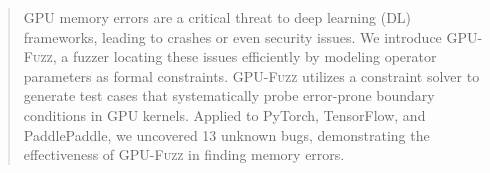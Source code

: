 \documentclass[sigconf]{acmart}
\begin{document}
\makeatletter
\def\@mkauthors@iii{%
  \gdef\@currentauthors{}%
  \gdef\@currentaffiliation{}%
  \global\setbox\mktitle@bx=\vbox{%
    \noindent\unvbox\mktitle@bx\par\medskip
    \centering
    {\Large
      Zihao Li\textsuperscript{1,2,*},
      Hongyi Lu\textsuperscript{1,2,3,*},
      Yanan Guo\textsuperscript{4},
      Zhenkai Zhang\textsuperscript{5},
      Shuai Wang\textsuperscript{3},
      Fengwei Zhang\textsuperscript{2,1,\textdagger}\par}%
    \vspace{0.3em}%
    {\normalsize
      \nolinkurl{lizh2025@mail.sustech.edu.cn},
      \nolinkurl{luhy2017@mail.sustech.edu.cn},
      \nolinkurl{yanan.guo@rochester.edu}\par
      \nolinkurl{zhenkai@clemson.edu},
      \nolinkurl{shuaiw@cse.ust.hk},
      \nolinkurl{zhangfw@sustech.edu.cn}\par}%
    \vspace{0.2em}%
    {{\small\rmfamily\itshape
      \textsuperscript{1}Research Institute of Trustworthy Autonomous Systems, Southern University of Science and Technology\par
      \textsuperscript{2}Department of Computer Science and Engineering, Southern University of Science and Technology\par
      \textsuperscript{3}Department of Computer Science and Engineering, Hong Kong University of Science and Technology\par
      \textsuperscript{4}University of Rochester\par
      \textsuperscript{5}Clemson University\par}}%
    \vspace{0.4em}%
  }%
}
\makeatother

\begin{abstract}
  GPU memory errors are a critical threat to deep learning (DL) frameworks, leading to crashes or even security issues. We introduce \textsc{GPU-Fuzz}, a fuzzer locating these issues efficiently by modeling operator parameters as formal constraints. \textsc{GPU-Fuzz} utilizes a constraint solver to generate test cases that systematically probe error-prone boundary conditions in GPU kernels. Applied to PyTorch, TensorFlow, and PaddlePaddle, we uncovered 13 unknown bugs, demonstrating the effectiveness of \textsc{GPU-Fuzz} in finding memory errors.
  \end{abstract}

\end{document}
